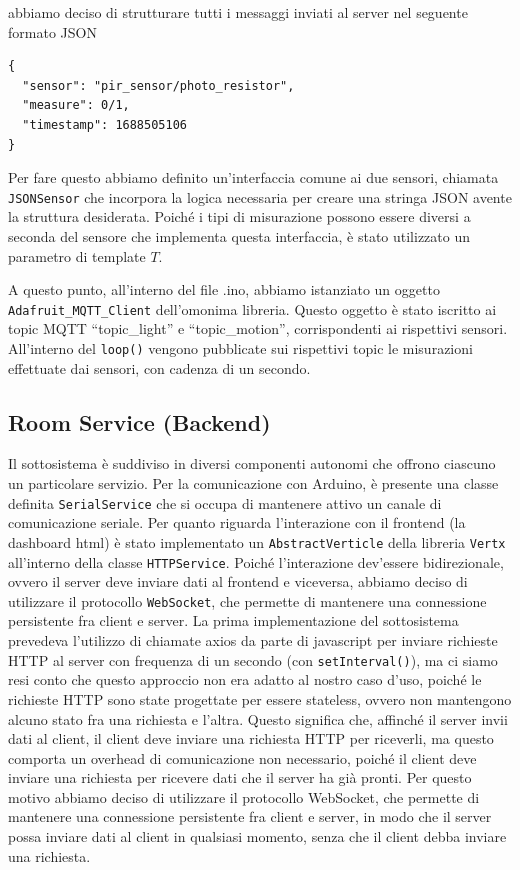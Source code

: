 \documentclass[a4paper,12pt]{report}
\begin{document}
abbiamo deciso di strutturare tutti i messaggi inviati al server nel seguente formato JSON
\begin{lstlisting}[style=json]
{
  "sensor": "pir_sensor/photo_resistor",
  "measure": 0/1,
  "timestamp": 1688505106
}
\end{lstlisting}
Per fare questo abbiamo definito un'interfaccia comune ai due sensori, chiamata \texttt{JSONSensor} che incorpora la logica necessaria per creare una stringa JSON avente la struttura desiderata. Poiché i tipi di misurazione possono essere diversi a seconda del sensore che implementa questa interfaccia, è stato utilizzato un parametro di template $T$.

A questo punto, all'interno del file .ino, abbiamo istanziato un oggetto \texttt{Adafruit\_MQTT\_Client} dell'omonima libreria. Questo oggetto è stato iscritto ai topic MQTT ``topic\_light'' e ``topic\_motion'', corrispondenti ai rispettivi sensori.
All'interno del \texttt{loop()} vengono pubblicate sui rispettivi topic le misurazioni effettuate dai sensori, con cadenza di un secondo.

\subsection{Room Service (Backend)}
Il sottosistema è suddiviso in diversi componenti autonomi che offrono ciascuno un particolare servizio.
Per la comunicazione con Arduino, è presente una classe definita \texttt{SerialService} che si occupa di mantenere attivo un canale di comunicazione seriale. 
Per quanto riguarda l'interazione con il frontend (la dashboard html) è stato implementato un \texttt{AbstractVerticle} della libreria \texttt{Vertx} all'interno della classe \texttt{HTTPService}. Poiché l'interazione dev'essere bidirezionale, ovvero il server deve inviare dati al frontend e viceversa, 
abbiamo deciso di utilizzare il protocollo \texttt{WebSocket}, che permette di mantenere una connessione persistente fra client e server.
La prima implementazione del sottosistema prevedeva l'utilizzo di chiamate axios da parte di javascript per inviare richieste HTTP al server con frequenza di un secondo (con \texttt{setInterval()}), ma ci siamo resi conto che questo approccio non era adatto al nostro caso d'uso, poiché le richieste HTTP sono state progettate per essere stateless, ovvero non mantengono alcuno stato fra una richiesta e l'altra. Questo significa che, affinché il server invii dati al client, il client deve inviare una richiesta HTTP per riceverli, ma questo comporta un overhead di comunicazione non necessario, poiché il client deve inviare una richiesta per ricevere dati che il server ha già pronti. Per questo motivo abbiamo deciso di utilizzare il protocollo WebSocket, che permette di mantenere una connessione persistente fra client e server, in modo che il server possa inviare dati al client in qualsiasi momento, senza che il client debba inviare una richiesta.
\end{document}
